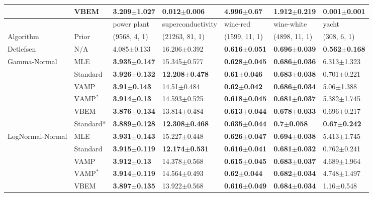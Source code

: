 \begin{tabular}{lllllll}
                 & VBEM &  \textbf{3.209$\pm$1.027} &  \textbf{0.012$\pm$0.006} &            4.996$\pm$0.67 &           1.912$\pm$0.219 &           0.001$\pm$0.001 \\
\midrule
                 &      &               power plant &          superconductivity &                  wine-red &                wine-white &                     yacht \\
Algorithm & Prior& (9568, 4, 1)& (21263, 81, 1)& (1599, 11, 1)& (4898, 11, 1)& (308, 6, 1)\\
\midrule
Detlefsen & N/A &           4.085$\pm$0.133 &           16.206$\pm$0.392 &  \textbf{0.616$\pm$0.051} &  \textbf{0.696$\pm$0.039} &  \textbf{0.562$\pm$0.168} \\
Gamma-Normal & MLE &  \textbf{3.935$\pm$0.147} &           15.345$\pm$0.577 &  \textbf{0.628$\pm$0.045} &  \textbf{0.686$\pm$0.036} &           6.313$\pm$1.323 \\
                 & Standard &  \textbf{3.926$\pm$0.132} &  \textbf{12.208$\pm$0.478} &   \textbf{0.61$\pm$0.046} &  \textbf{0.683$\pm$0.038} &           0.701$\pm$0.221 \\
                 & VAMP &   \textbf{3.91$\pm$0.143} &            14.51$\pm$0.484 &   \textbf{0.62$\pm$0.042} &  \textbf{0.686$\pm$0.034} &            5.06$\pm$1.388 \\
                 & $\text{VAMP}^*$ &   \textbf{3.914$\pm$0.13} &           14.593$\pm$0.525 &  \textbf{0.618$\pm$0.045} &  \textbf{0.681$\pm$0.037} &           5.382$\pm$1.745 \\
                 & VBEM &  \textbf{3.876$\pm$0.134} &           13.814$\pm$0.484 &  \textbf{0.613$\pm$0.044} &  \textbf{0.678$\pm$0.033} &           0.696$\pm$0.217 \\
                 & Standard* &  \textbf{3.889$\pm$0.128} &  \textbf{12.308$\pm$0.468} &  \textbf{0.635$\pm$0.044} &    \textbf{0.7$\pm$0.058} &   \textbf{0.67$\pm$0.242} \\
LogNormal-Normal & MLE &  \textbf{3.931$\pm$0.143} &           15.227$\pm$0.448 &  \textbf{0.626$\pm$0.047} &  \textbf{0.694$\pm$0.038} &           5.413$\pm$1.745 \\
                 & Standard &  \textbf{3.915$\pm$0.119} &  \textbf{12.174$\pm$0.531} &  \textbf{0.616$\pm$0.041} &  \textbf{0.681$\pm$0.032} &           0.762$\pm$0.241 \\
                 & VAMP &   \textbf{3.912$\pm$0.13} &           14.378$\pm$0.568 &  \textbf{0.615$\pm$0.045} &  \textbf{0.683$\pm$0.037} &           4.689$\pm$1.964 \\
                 & $\text{VAMP}^*$ &  \textbf{3.914$\pm$0.119} &           14.564$\pm$0.493 &   \textbf{0.62$\pm$0.044} &  \textbf{0.682$\pm$0.034} &           4.748$\pm$1.497 \\
                 & VBEM &  \textbf{3.897$\pm$0.135} &           13.922$\pm$0.568 &  \textbf{0.616$\pm$0.049} &  \textbf{0.684$\pm$0.034} &            1.16$\pm$0.548 \\
\bottomrule
\end{tabular}

